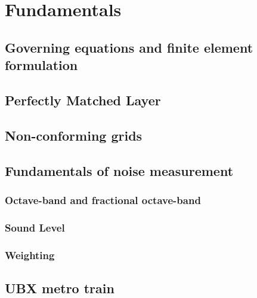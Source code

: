 \chapter{Fundamentals}
\label{chap:Theory}

\section{Governing equations and finite element formulation}
\section{Perfectly Matched Layer}
\section{Non-conforming grids}
\section{Fundamentals of noise measurement}
\subsection{Octave-band and fractional octave-band}
\subsection{Sound Level}
\subsection{Weighting}
\section{UBX metro train}
\label{section:ubx_geometry}